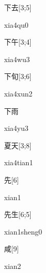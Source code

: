 \begin{verbete}[xia4qu0]{下去}[3;5]
\begin{pronuncia}{xia4qu0}
\end{pronuncia}
\end{verbete}

\begin{verbete}[xia4wu3]{下午}[3;4]
\begin{pronuncia}{xia4wu3}
\end{pronuncia}
\end{verbete}

\begin{verbete}{下旬}[3;6]
\begin{pronuncia}{xia4xun2}
\end{pronuncia}
\end{verbete}

\begin{verbete}[xia4yu3]{下雨}
\begin{pronuncia}{xia4yu3}
\end{pronuncia}
\end{verbete}

\begin{verbete}{夏天}[3;8]
\begin{pronuncia}{xia4tian1}
\end{pronuncia}
\end{verbete}

\begin{verbete}[xian1]{先}[6]
\begin{pronuncia}{xian1}
\end{pronuncia}
\end{verbete}

\begin{verbete}{先生}[6;5]
\begin{pronuncia}{xian1sheng0}
\end{pronuncia}
\end{verbete}

\begin{verbete}[xian2]{咸}[9]
\begin{pronuncia}{xian2}
\end{pronuncia}
\end{verbete}

